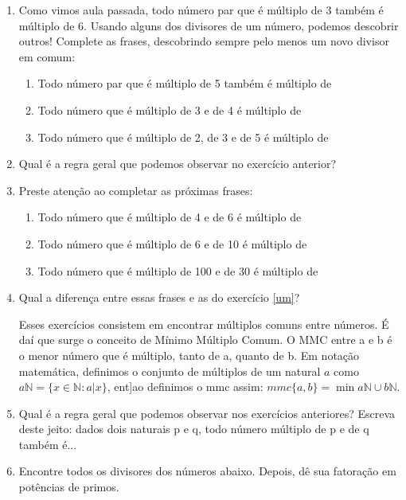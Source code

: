 \documentclass{article}
\begin{document}
\begin{enumerate}
	\item \label{um} Como vimos aula passada, todo número par que é múltiplo de 3 também é múltiplo de 6. 
	Usando alguns dos divisores de um número, podemos descobrir outros!
	Complete as frases, descobrindo sempre pelo menos um novo divisor em comum:
		\begin{enumerate}
		\item Todo número par que é múltiplo de 5 também é múltiplo de 
		\item Todo número que é múltiplo de 3 e de 4 é múltiplo de
		\item Todo número que é múltiplo de 2, de 3 e de 5 é múltiplo de
		\end{enumerate}
	\item Qual é a regra geral que podemos observar no exercício anterior?
	\item Preste atenção ao completar as próximas frases:
		\begin{enumerate}
		\item Todo número que é múltiplo de 4 e de 6 é múltiplo de
		\item Todo número que é múltiplo de 6 e de 10 é múltiplo de
		\item Todo número que é múltiplo de 100 e de 30 é múltiplo de
		\end{enumerate}
	\item Qual a diferença entre essas frases e as do exercício \ref{um}?

	Esses exercícios consistem em encontrar múltiplos comuns entre números. É daí que surge o conceito de
	Mínimo Múltiplo Comum. O MMC entre a e b é o menor número que é múltiplo, tanto de a, quanto de b.
	Em notação matemática, definimos o conjunto de múltiplos de um natural $a$ como $a\mathbb{N} = 
	\{x \in \mathbb{N} : a | x \}$, ent]ao definimos o mmc assim: $mmc\{a,b\} = \min a\mathbb{N}\cup b\mathbb{N}$.

	\item Qual é a regra geral que podemos observar nos exercícios anteriores? Escreva deste jeito: dados dois
	naturais p e q, todo número múltiplo de p e de q também é...

	\item Encontre todos os divisores dos números abaixo. Depois, dê sua fatoração em potências de primos.
		\begin{enumerate}
		\end{enumerate}


\end{enumerate}
\end{document}
